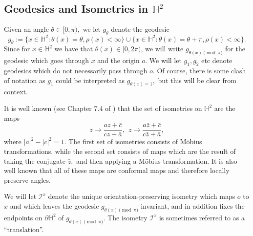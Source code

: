 \documentclass[a4paper,12pt]{article}
\newcommand{\BH}{{\mathbb{H}}}
\newcommand{\CI}{{\mathcal{I}}}
\begin{document}
\subsection{Geodesics and Isometries in $\BH^2$}
Given an angle $\theta\in [0,\pi),$ we let $g_\theta$ denote the geodesic 
\begin{equation} \label{eqn:defgeodesic}
  g_\theta:=\{x\in \BH^2: \theta(x)=\theta, \rho(x)<\infty\}
\cup
\{x\in \BH^2: \theta(x)=\theta+\pi, \rho(x)<\infty\}.  
\end{equation}
Since for $x\in \BH^2$ we have that $\theta(x)\in[0,2\pi)$, we will write
$g_{\theta(x) \pmod \pi}$ 
for the geodesic which goes through $x$ and the origin $o.$ We will let $g_1,g_2$ etc denote 
geodesics which do not necessarily pass through $o.$ Of course, there is some clash of notation 
as $g_1$ could be interpreted as $g_{\theta(x)=1},$ but this will be clear from context.

It is well known (see Chapter 7.4 of \cite{B_93}) that the set of isometries on $\BH^2$ are the maps
\[
z \to \frac{az+\bar{c}}{cz+\bar{a}}, \ \ z \to \frac{a\bar{z}+\bar{c}}{c\bar{z}+\bar{a}},
\]
where $|a|^2-|c|^2=1.$ The first set of isometries consists of Möbius transformations,  while the second
set consists of maps which are the result of taking the conjugate $\bar{z},$ and then applying a 
Möbius transformation.
It is also well known that all of these maps are conformal maps and therefore locally 
preserve angles. 


We will let $\CI^x$ denote the unique orientation-preserving 
isometry which maps $o$ to $x$ and which leaves 
the geodesic $g_{\theta(x) \pmod \pi}$ invariant, and in addition 
fixes the endpoints on $\partial \BH^2$
of $g_{\theta(x) \pmod \pi}.$ The isometry $\CI^x$  is 
sometimes referred to as a ``translation''. 
\end{document}
